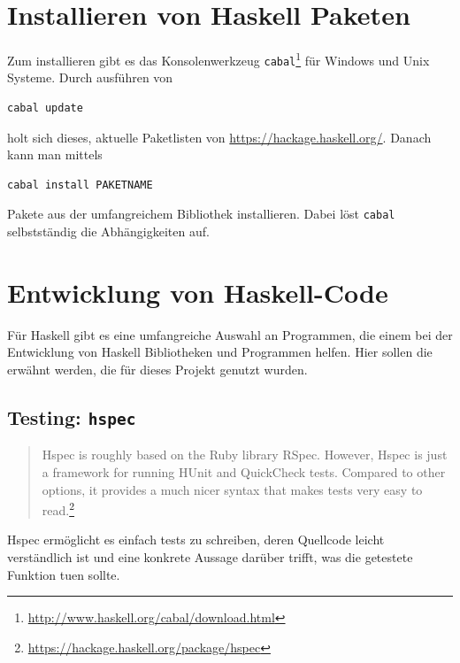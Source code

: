 \section{Installieren von Haskell Paketen}
Zum installieren gibt es das Konsolenwerkzeug
\texttt{cabal}\footnote{\url{http://www.haskell.org/cabal/download.html}} für
Windows und Unix Systeme.
Durch ausführen von
\begin{lstlisting}[language=bash 
                  ,numbers=none
                  ,backgroundcolor=\color{lightgray}]
cabal update
\end{lstlisting}
holt sich dieses, aktuelle Paketlisten von
\url{https://hackage.haskell.org/}. Danach kann man mittels
\begin{lstlisting}[language=bash
                  ,numbers=none
                  ,backgroundcolor=\color{lightgray}]
cabal install PAKETNAME
\end{lstlisting}
Pakete aus der umfangreichem Bibliothek installieren.
Dabei löst \texttt{cabal} selbstständig die Abhängigkeiten auf.

\section{Entwicklung von Haskell-Code}
Für Haskell gibt es eine umfangreiche Auswahl an Programmen, die einem bei der
Entwicklung von Haskell Bibliotheken und Programmen helfen. Hier sollen die
erwähnt werden, die für dieses Projekt genutzt wurden.

\subsection{Testing: \texttt{hspec}}
\begin{quote}
  Hspec is roughly based on the Ruby library RSpec. However, Hspec is just a
  framework for running HUnit and QuickCheck tests. Compared to other options,
  it provides a much nicer syntax that makes tests very easy to
  read.\footnote{\url{https://hackage.haskell.org/package/hspec}}
\end{quote}
Hspec ermöglicht es einfach tests zu schreiben, deren Quellcode leicht
verständlich ist und eine konkrete Aussage darüber trifft, was die getestete
Funktion tuen sollte.

